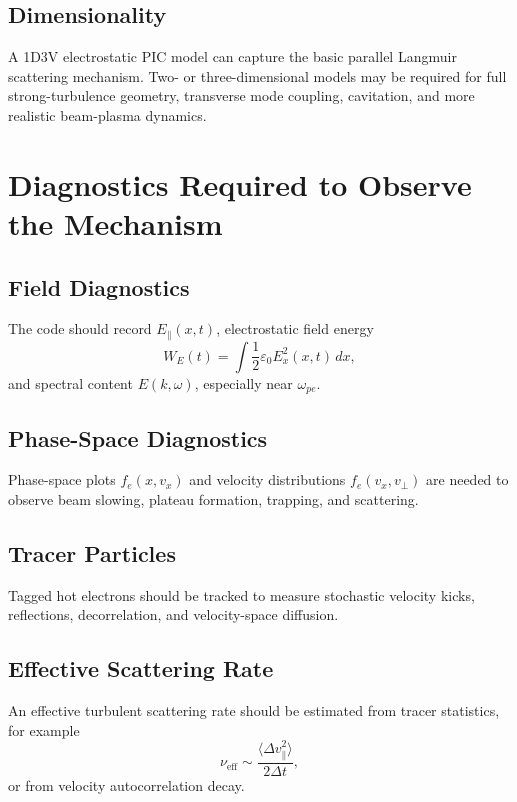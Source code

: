 \documentclass[11pt,a4paper]{article}
\begin{document}
\subsection{Dimensionality}
A 1D3V electrostatic PIC model can capture the basic parallel Langmuir scattering mechanism. Two- or three-dimensional models may be required for full strong-turbulence geometry, transverse mode coupling, cavitation, and more realistic beam-plasma dynamics.

\section{Diagnostics Required to Observe the Mechanism}

\subsection{Field Diagnostics}
The code should record $E_\parallel(x,t)$, electrostatic field energy
\begin{equation}
    W_E(t)=\int \frac{1}{2}\varepsilon_0 E_x^2(x,t)\,dx,
\end{equation}
and spectral content $E(k,\omega)$, especially near $\omega_{pe}$.

\subsection{Phase-Space Diagnostics}
Phase-space plots $f_e(x,v_x)$ and velocity distributions $f_e(v_x,v_\perp)$ are needed to observe beam slowing, plateau formation, trapping, and scattering.

\subsection{Tracer Particles}
Tagged hot electrons should be tracked to measure stochastic velocity kicks, reflections, decorrelation, and velocity-space diffusion.

\subsection{Effective Scattering Rate}
An effective turbulent scattering rate should be estimated from tracer statistics, for example
\begin{equation}
    \nu_{\mathrm{eff}} \sim \frac{\langle \Delta v_\parallel^2\rangle}{2\Delta t},
\end{equation}
or from velocity autocorrelation decay.
\end{document}
